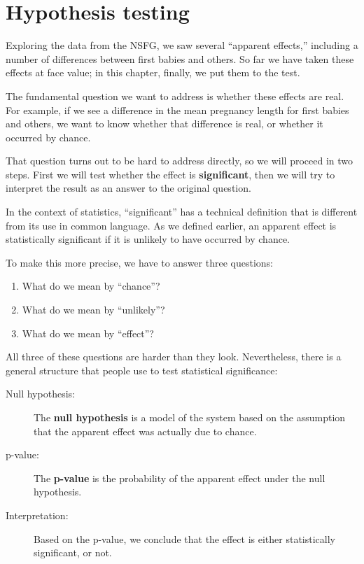 \documentclass[12pt]{book}
\begin{document}
\chapter{Hypothesis testing}
\label{testing}

Exploring the data from the NSFG, we saw several ``apparent effects,''
including a number of differences between first babies and others.
So far we have taken these effects at face value; in this chapter,
finally, we put them to the test.

The fundamental question we want to address is whether these effects
are real.  For example, if we see a difference in the mean pregnancy
length for first babies and others, we want to know whether that
difference is real, or whether it occurred by chance.

That question turns out to be hard to address directly, so we will
proceed in two steps.  First we will test whether the effect is {\bf
  significant}, then we will try to interpret the result
  as an answer to the original question.

In the context of statistics, ``significant'' has a technical
definition that is different from its use in common language.
As we defined earlier, an apparent effect is statistically
significant if it is unlikely to have occurred by chance.

To make this more precise, we have to answer three questions:

\begin{enumerate}

\item What do we mean by ``chance''?

\item What do we mean by ``unlikely''?

\item What do we mean by ``effect''?

\end{enumerate}

All three of these questions are harder than they look.  Nevertheless,
there is a general structure that people use to test statistical
significance:

\begin{description}

\item[Null hypothesis:] The {\bf null hypothesis} is a model of the
  system based on the assumption that the apparent effect was actually
  due to chance.

\item[p-value:] The {\bf p-value} is the probability of the apparent
  effect under the null hypothesis.

\item[Interpretation:] Based on the p-value, we conclude that the
  effect is either statistically significant, or not.

\end{description}
\end{document}
